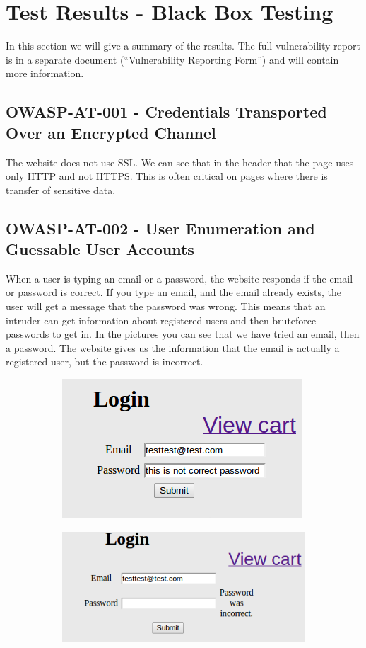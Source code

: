 \clearpage
\section{Test Results - Black Box Testing}

In this section we will give a summary of the results. The full vulnerability report is in a separate document (“Vulnerability Reporting Form”) and will contain more information.

\subsection{OWASP-AT-001 - Credentials Transported Over an Encrypted Channel}
The website does not use SSL. We can see that in the header that the page uses only HTTP and not 
HTTPS. This is often critical on pages where there is transfer of sensitive data.

\subsection{OWASP-AT-002 - User Enumeration and Guessable User Accounts}
When a user is typing an email or a password, the website responds if the email or password is correct. If you type an email, and the email already exists, the user will get a message that the password was wrong. This means that an intruder can get information about registered users and then bruteforce passwords to get in. In the pictures you can see that we have tried an email, then a password. The website gives us the information that the email is actually a registered user, but the password is incorrect.


\begin{figure}[!ht]
\begin{subfigure}{.5\textwidth}
  \includegraphics[scale=0.5]{pics/login1.png}
\end{subfigure}%
\begin{subfigure}{.5\textwidth}
  \includegraphics[scale=0.5]{pics/login2.png}
\end{subfigure}
\end{figure}

